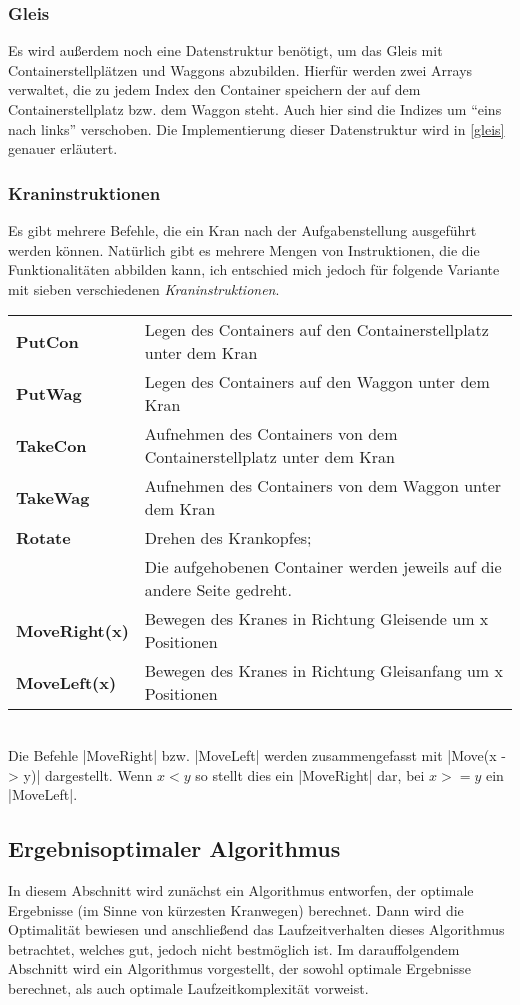 \subsubsection{Gleis}
Es wird außerdem noch eine Datenstruktur benötigt, um das Gleis mit Containerstellplätzen und Waggons abzubilden.
Hierfür werden zwei Arrays verwaltet, die zu jedem Index den Container speichern der auf dem Containerstellplatz bzw. dem Waggon steht.
Auch hier sind die Indizes um ``eins nach links'' verschoben.
Die Implementierung dieser Datenstruktur wird in \ref{gleis} genauer erläutert.
\subsubsection{Kraninstruktionen}
Es gibt mehrere Befehle, die ein Kran nach der Aufgabenstellung ausgeführt werden können.
Natürlich gibt es mehrere Mengen von Instruktionen, die die Funktionalitäten abbilden kann, ich entschied mich jedoch für folgende Variante mit sieben verschiedenen \emph{Kraninstruktionen}.
\\
\begin{tabular}{ll}
 \textbf{PutCon} & Legen des Containers auf den Containerstellplatz unter dem Kran \\
 \textbf{PutWag} & Legen des Containers auf den Waggon unter dem Kran \\
 \textbf{TakeCon} & Aufnehmen des Containers von dem Containerstellplatz unter dem Kran \\
 \textbf{TakeWag} & Aufnehmen des Containers von dem Waggon unter dem Kran \\
 \textbf{Rotate} & Drehen des Krankopfes; \\
                 & Die aufgehobenen Container werden jeweils auf die andere Seite gedreht. \\
 \textbf{MoveRight(x)} & Bewegen des Kranes in Richtung Gleisende um x Positionen \\
 \textbf{MoveLeft(x)}  & Bewegen des Kranes in Richtung Gleisanfang um x Positionen \\
\end{tabular} \\

Die Befehle |MoveRight| bzw. |MoveLeft| werden zusammengefasst mit |Move(x -> y)| dargestellt.
Wenn $x < y$ so stellt dies ein |MoveRight| dar, bei $x >= y$ ein |MoveLeft|.

\subsection{Ergebnisoptimaler Algorithmus}
In diesem Abschnitt wird zunächst ein Algorithmus entworfen, der optimale Ergebnisse (im Sinne von kürzesten Kranwegen) berechnet.
Dann wird die Optimalität bewiesen und anschließend das Laufzeitverhalten dieses Algorithmus betrachtet, welches gut, jedoch nicht bestmöglich ist.
Im darauffolgendem Abschnitt wird ein Algorithmus vorgestellt, der sowohl optimale Ergebnisse berechnet, als auch optimale Laufzeitkomplexität vorweist.
